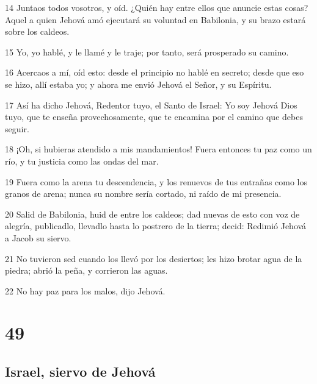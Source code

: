 \par 14 Juntaos todos vosotros, y oíd. ¿Quién hay entre ellos que anuncie estas cosas? Aquel a quien Jehová amó ejecutará su voluntad en Babilonia, y su brazo estará sobre los caldeos.
\par 15 Yo, yo hablé, y le llamé y le traje; por tanto, será prosperado su camino.
\par 16 Acercaos a mí, oíd esto: desde el principio no hablé en secreto; desde que eso se hizo, allí estaba yo; y ahora me envió Jehová el Señor, y su Espíritu.
\par 17 Así ha dicho Jehová, Redentor tuyo, el Santo de Israel: Yo soy Jehová Dios tuyo, que te enseña provechosamente, que te encamina por el camino que debes seguir.
\par 18 ¡Oh, si hubieras atendido a mis mandamientos! Fuera entonces tu paz como un río, y tu justicia como las ondas del mar.
\par 19 Fuera como la arena tu descendencia, y los renuevos de tus entrañas como los granos de arena; nunca su nombre sería cortado, ni raído de mi presencia.
\par 20 Salid de Babilonia, huid de entre los caldeos; dad nuevas de esto con voz de alegría, publicadlo, llevadlo hasta lo postrero de la tierra; decid: Redimió Jehová a Jacob su siervo.
\par 21 No tuvieron sed cuando los llevó por los desiertos; les hizo brotar agua de la piedra; abrió la peña, y corrieron las aguas.
\par 22 No hay paz para los malos, dijo Jehová. 

\chapter{49}

\section*{Israel, siervo de Jehová}

